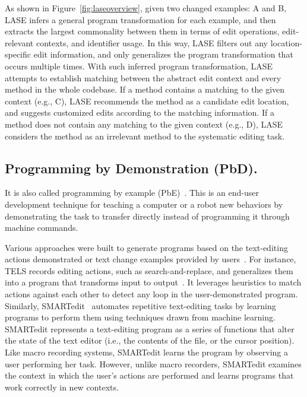 \documentclass[runningheads,a4paper]{llncs}
\begin{document}
As shown in Figure~\ref{fig:laseoverview}, given two changed examples: A and B, LASE infers a general program transformation for each example, and then extracts the largest commonality between them in terms of edit operations, edit-relevant contexts, and identifier usage. In this way, LASE filters out any location-specific edit information, and only generalizes the program transformation that occurs multiple times. With such inferred program transformation, LASE attempts to establish matching between the abstract edit context and every method in the whole codebase. If a method contains a matching to the given context (e.g., C), LASE recommends the method as a candidate edit location, and suggests customized edits according to the matching information. If a method does not contain any matching to the given context (e.g., D), LASE considers the method as an irrelevant method to the systematic editing task.


\subsection{Programming by Demonstration (PbD).}
It is also called programming by example (PbE)~\cite{Lie2001}. 
This is an end-user development technique for teaching a computer or a robot new behaviors by demonstrating the task to transfer directly instead of programming it through machine commands. 

Various approaches were built to generate programs based on the text-editing actions demonstrated or text change examples provided by users~\cite{Nix1984,WiM1993,LaH1995,LWD2001}. For instance, 
TELS records editing actions, such as search-and-replace, and generalizes them into a program that transforms input to output~\cite{WiM1993}. It leverages heuristics to match actions against each other to detect any loop in the user-demonstrated program. 
Similarly, SMARTedit~\cite{LWD2001} automates repetitive text-editing tasks by learning programs to perform them using techniques drawn from machine learning. SMARTedit represents a text-editing program as a series of functions that alter the state of the text editor (i.e., the contents of the file, or the cursor position). Like macro recording systems, SMARTedit learns the program by observing a user performing her task. However, unlike macro recorders, SMARTedit examines the context in which the user's actions are performed and learns programs that work correctly in new contexts. 
\end{document}
